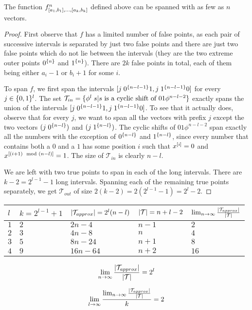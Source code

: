 \begin{lemma}
The function
$f^n_{[a_1, b_1], \ldots, [a_k, b_k]}$
defined above can be spanned with as few as $n$ vectors.
\end{lemma}

\begin{proof}
First observe that $f$
has a limited number of false points,
as each pair of successive intervals
is separated by just two false points
and there are just two false points
which do not lie between the intervals
(they are the two extreme outer points
$0^{\{n\}}$ and $1^{\{n\}}$).
There are $2k$ false points in total,
each of them being either $a_i - 1$ or $b_i + 1$
for some $i$.

To span $f$,
we first span the intervals
$[j \; 0^{\{n-l-1\}} 1, j \; 1^{\{n-l-1\}} 0]$
for every $j \in \{0, 1\}^l$.
The set
$\mathcal{T}_{in} =
\{\phi^l \; s |
s \text{ is a cyclic shift of } 01 \phi^{n-l-2}\}$
exactly spans the union of the intervals
$[j \; 0^{\{n-l-1\}} 1, j \; 1^{\{n-l-1\}} 0]$.
To see that it actually does,
observe that for every $j$,
we want to span all the vectors with prefix $j$
except the two vectors $(j \; 0^{\{n-l\}})$
and $(j \; 1^{\{n-l\}})$.
The cyclic shifts of $01 \phi^{n-l-2}$ span exactly
all the numbers with the exception of
$0^{\{n-l\}}$ and $1^{\{n-l\}}$,
since every number that contains both a $0$ and a $1$
has some position $i$ such that
$x^{[i]} = 0$
and $x^{[(i+1) \mod (n-l)]} = 1$.
The size of $\mathcal{T}_{in}$ is clearly $n-l$.

We are left with two true points to span
in each of the long intervals.
There are $k-2 = 2^{l-1} - 1$ long intervals.
Spanning each of the remaining true points separately,
we get $\mathcal{T}_{out}$ of size
$2(k-2) = 2(2^{l-1}-1) = 2^l - 2$.

\end{proof}

\begin{center}
\begin{tabular}{l|llll}
$l$
& $k = 2^{l-1} + 1$
& $\lvert\mathcal{T}_{approx}\rvert = 2^l (n-l)$
& $\lvert\mathcal{T}\rvert = n + l - 2$
& $\lim_{n \rightarrow \infty}
{\frac{\lvert\mathcal{T}_{approx}\rvert}{\lvert\mathcal{T}\rvert}}$
\\
\hline
$1$ & $2$ & $2n-4$ & $n-1$ & $2$ \\
$2$ & $3$ & $4n-8$ & $n$ & $4$ \\
$3$ & $5$ & $8n-24$ & $n+1$ & $8$ \\
$4$ & $9$ & $16n-64$ & $n+2$ & $16$
\end{tabular}
\end{center}

\[
\lim_{n \rightarrow \infty}{
\frac{\lvert\mathcal{T}_{approx}\rvert}{\lvert\mathcal{T}\rvert}
}
=
2^l
\]

\[
\lim_{l \rightarrow \infty}{
\frac{
\lim_{n \rightarrow \infty}{
\frac{\lvert\mathcal{T}_{approx}\rvert}{\lvert\mathcal{T}\rvert}
}
}{k}
}
=
2
\]

